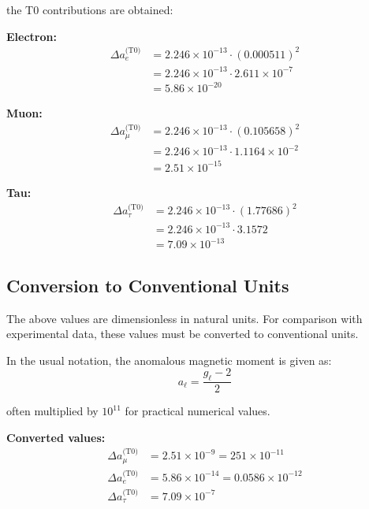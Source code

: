 	the T0 contributions are obtained:
	
	\textbf{Electron:}
	\begin{equation}
		\begin{split}
			\Delta a_e^{\text{(T0)}} &= 2.246 \times 10^{-13} \cdot (0.000511)^2 \\
			&= 2.246 \times 10^{-13} \cdot 2.611 \times 10^{-7} \\
			&= 5.86 \times 10^{-20}
		\end{split}
		\label{eq:electron_prediction}
	\end{equation}
	
	\textbf{Muon:}
	\begin{equation}
		\begin{split}
			\Delta a_\mu^{\text{(T0)}} &= 2.246 \times 10^{-13} \cdot (0.105658)^2 \\
			&= 2.246 \times 10^{-13} \cdot 1.1164 \times 10^{-2} \\
			&= 2.51 \times 10^{-15}
		\end{split}
		\label{eq:muon_prediction}
	\end{equation}
	
	\textbf{Tau:}
	\begin{equation}
		\begin{split}
			\Delta a_\tau^{\text{(T0)}} &= 2.246 \times 10^{-13} \cdot (1.77686)^2 \\
			&= 2.246 \times 10^{-13} \cdot 3.1572 \\
			&= 7.09 \times 10^{-13}
		\end{split}
		\label{eq:tau_prediction}
	\end{equation}
	
	\subsection{Conversion to Conventional Units}
	
	The above values are dimensionless in natural units. For comparison with experimental data, these values must be converted to conventional units.
	
	In the usual notation, the anomalous magnetic moment is given as:
	\begin{equation}
		a_\ell = \frac{g_\ell - 2}{2}
		\label{eq:conventional_definition}
	\end{equation}
	
	often multiplied by $10^{11}$ for practical numerical values.
	
	\textbf{Converted values:}
	\begin{align}
		\Delta a_\mu^{\text{(T0)}} &= 2.51 \times 10^{-9} = 251 \times 10^{-11} \label{eq:muon_conventional} \\
		\Delta a_e^{\text{(T0)}} &= 5.86 \times 10^{-14} = 0.0586 \times 10^{-12} \label{eq:electron_conventional} \\
		\Delta a_\tau^{\text{(T0)}} &= 7.09 \times 10^{-7} \label{eq:tau_conventional}
	\end{align}
	
